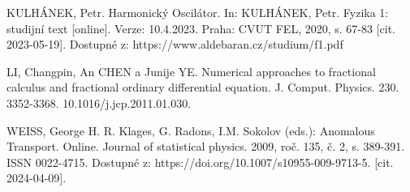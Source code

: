 \documentclass[a4paper,12pt,twoside]{article}
\theoremstyle{definition}
\theoremstyle{remark}
\numberwithin{equation}{section}
\numberwithin{table}{section}
\numberwithin{figure}{section}
\begin{document}
\begin{thebibliography}{12}
 KULHÁNEK, Petr. Harmonický Oscilátor. In: KULHÁNEK, Petr. Fyzika 1: studijní text [online]. Verze: 10.4.2023. Praha: CVUT FEL, 2020, s. 67-83 [cit. 2023-05-19]. Dostupné z: https://www.aldebaran.cz/studium/f1.pdf

 LI, Changpin, An CHEN a Junije YE. Numerical approaches to fractional calculus and fractional ordinary differential equation. J. Comput. Physics. 230. 3352-3368. 10.1016/j.jcp.2011.01.030. 

 WEISS, George H. R. Klages, G. Radons, I.M. Sokolov (eds.): Anomalous Transport. Online. Journal of statistical physics. 2009, roč. 135, č. 2, s. 389-391. ISSN 0022-4715. Dostupné z: https://doi.org/10.1007/s10955-009-9713-5. [cit. 2024-04-09].

\end{thebibliography}
\end{document}

